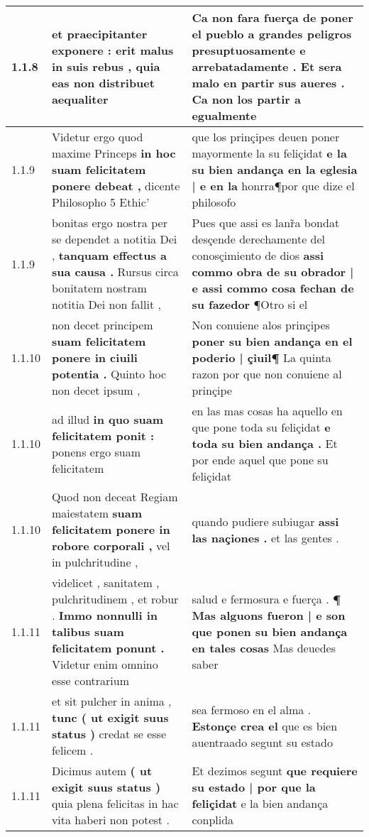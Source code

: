 \begin{tabular}{|p{1cm}|p{6.5cm}|p{6.5cm}|}
1.1.8 & et praecipitanter exponere : \textbf{ erit malus in suis rebus , } quia eas non distribuet aequaliter & Ca non fara fuerça de poner el pueblo a grandes peligros presuptuosamente e arrebatadamente . \textbf{ Et sera malo en partir sus aueres . } Ca non los partir a egualmente \\\hline
1.1.9 & Videtur ergo quod maxime Princeps \textbf{ in hoc suam felicitatem ponere debeat , } dicente Philosopho 5 Ethic’ & que los prinçipes deuen poner mayormente la su feliçidat \textbf{ e la su bien andança en la eglesia | e en la } honrra¶por que dize el philosofo \\\hline
1.1.9 & bonitas ergo nostra per se dependet a notitia Dei , \textbf{ tanquam effectus a sua causa . } Rursus circa bonitatem nostram notitia Dei non fallit , & Pues que assi es lanr̃a bondat desçende derechamente del conosçimiento de dios \textbf{ assi commo obra de su obrador | e assi commo cosa fechan de su fazedor } ¶Otro si el \\\hline
1.1.10 & non decet principem \textbf{ suam felicitatem ponere in ciuili potentia . } Quinto hoc non decet ipsum , & Non conuiene alos prinçipes \textbf{ poner su bien andança en el poderio | çiuil¶ } La quinta razon por que non conuiene al prinçipe \\\hline
1.1.10 & ad illud \textbf{ in quo suam felicitatem ponit : } ponens ergo suam felicitatem & en las mas cosas ha aquello en que pone toda su feliçidat \textbf{ e toda su bien andança . } Et por ende aquel que pone su feliçidat \\\hline
1.1.10 & Quod non deceat Regiam maiestatem \textbf{ suam felicitatem ponere in robore corporali , } vel in pulchritudine , & quando pudiere subiugar \textbf{ assi las naçiones . } et las gentes . \\\hline
1.1.11 & videlicet , sanitatem , pulchritudinem , et robur . \textbf{ Immo nonnulli in talibus suam felicitatem ponunt . } Videtur enim omnino esse contrarium & salud e fermosura e fuerça . \textbf{ ¶ Mas alguons fueron | e son que ponen su bien andança en tales cosas } Mas deuedes saber \\\hline
1.1.11 & et sit pulcher in anima , \textbf{ tunc ( ut exigit suus status ) } credat se esse felicem . & sea fermoso en el alma . \textbf{ Estonçe crea el } que es bien auentraado segunt su estado \\\hline
1.1.11 & Dicimus autem \textbf{ ( ut exigit suus status ) } quia plena felicitas in hac vita haberi non potest . & Et dezimos segunt \textbf{ que requiere su estado | por que la feliçidat } e la bien andança conplida \\\hline

\end{tabular}
